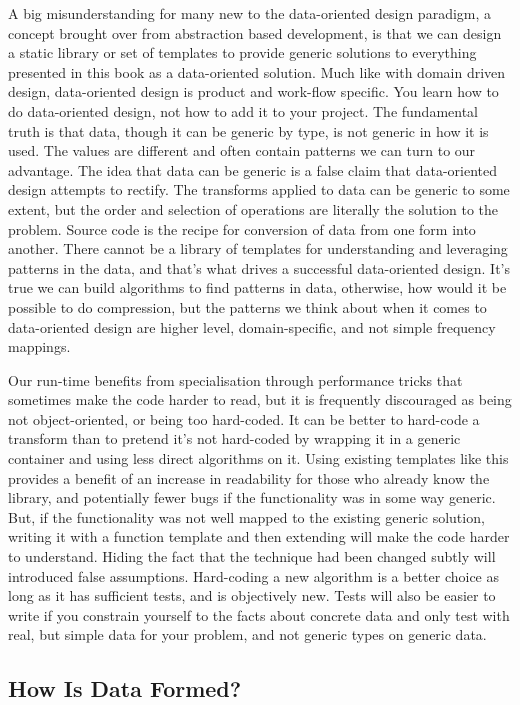 \documentclass[a4paper,12pt]{book}
\begin{document}
A big misunderstanding for many new to the data-oriented design paradigm, a concept brought over from abstraction based development, is that we can design a static library or set of templates to provide generic solutions to everything presented in this book as a data-oriented solution.
Much like with domain driven design, data-oriented design is product and work-flow specific.
You learn how to do data-oriented design, not how to add it to your project.
The fundamental truth is that data, though it can be generic by type, is not generic in how it is used.
The values are different and often contain patterns we can turn to our advantage.
The idea that data can be generic is a false claim that data-oriented design attempts to rectify.
The transforms applied to data can be generic to some extent, but the order and selection of operations are literally the solution to the problem.
Source code is the recipe for conversion of data from one form into another.
There cannot be a library of templates for understanding and leveraging patterns in the data, and that's what drives a successful data-oriented design.
It's true we can build algorithms to find patterns in data, otherwise, how would it be possible to do compression, but the patterns we think about when it comes to data-oriented design are higher level, domain-specific, and not simple frequency mappings.

Our run-time benefits from specialisation through performance tricks that sometimes make the code harder to read, but it is frequently discouraged as being not object-oriented, or being too hard-coded.
It can be better to hard-code a transform than to pretend it's not hard-coded by wrapping it in a generic container and using less direct algorithms on it.
Using existing templates like this provides a benefit of an increase in readability for those who already know the library, and potentially fewer bugs if the functionality was in some way generic.
But, if the functionality was not well mapped to the existing generic solution, writing it with a function template and then extending will make the code harder to understand.
Hiding the fact that the technique had been changed subtly will introduced false assumptions.
Hard-coding a new algorithm is a better choice as long as it has sufficient tests, and is objectively new.
Tests will also be easier to write if you constrain yourself to the facts about concrete data and only test with real, but simple data for your problem, and not generic types on generic data.

\subsection{How Is Data Formed?}
\end{document}
